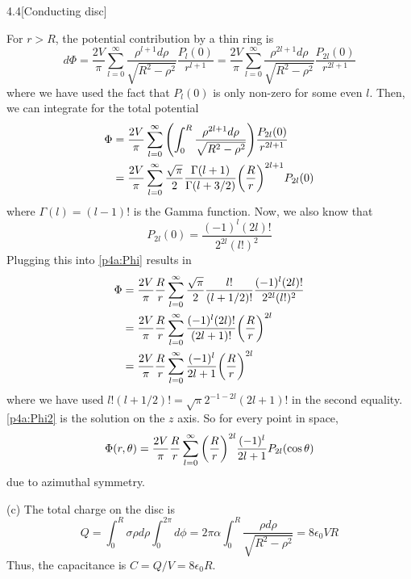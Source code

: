 \documentclass[12pt]{article}
\begin{document}
\begin{problem}{4.4}[Conducting disc]
\begin{solution}
For $r>R$, the potential contribution by a thin ring is
\begin{equation}
    d\Phi=\frac{2V}{\pi}\sum_{l=0}^\infty\frac{\rho^{l+1}d\rho}{\sqrt{R^2-\rho^2}}\frac{P_l(0)}{r^{l+1}}=\frac{2V}{\pi}\sum_{l=0}^\infty\frac{\rho^{2l+1}d\rho}{\sqrt{R^2-\rho^2}}\frac{P_{2l}(0)}{r^{2l+1}}
\end{equation}
where we have used the fact that $P_l(0)$ is only non-zero for some even $l$.
Then, we can integrate for the total potential
\begin{align}\label{p4a:Phi}
    \Phi&=\frac{2V}{\pi}\sum_{l=0}^\infty\qty(\int_0^R\frac{\rho^{2l+1}d\rho}{\sqrt{R^2-\rho^2}})\frac{P_{2l}(0)}{r^{2l+1}}
    \notag\\
        &=\frac{2V}{\pi}\sum_{l=0}^\infty\frac{\sqrt\pi}{2}\frac{\Gamma(l+1)}{\Gamma(l+3/2)}\qty(\frac{R}{r})^{2l+1}P_{2l}(0)
\end{align}
where $\Gamma(l)=(l-1)!$ is the Gamma function. Now, we also know that
\begin{equation}
    P_{2l}(0)=\frac{(-1)^l(2l)!}{2^{2l}(l!)^2} 
\end{equation}
Plugging this into \eqref{p4a:Phi} results in
\begin{align}\label{p4a:Phi2}
    \Phi&=\frac{2V}{\pi}\frac{R}{r}\sum_{l=0}^\infty\frac{\sqrt\pi}{2}\frac{l!}{(l+1/2)!}\frac{(-1)^l(2l)!}{2^{2l}(l!)^2}\notag\\
        &=\frac{2V}{\pi}\frac{R}{r}\sum_{l=0}^\infty\frac{(-1)^l(2l)!}{(2l+1)!}\qty(\frac{R}{r})^{2l}\notag\\
        &=\frac{2V}{\pi}\frac{R}{r}\sum_{l=0}^\infty\frac{(-1)^l}{2l+1}\qty(\frac{R}{r})^{2l}
\end{align}
where we have used $l!(l+1 /2)! =\sqrt{\pi}2^{-1-2l}(2l+1)!$ in the second
equality. \eqref{p4a:Phi2} is the solution on the $z$ axis. So for every point
in space,
\begin{equation}
    \Phi(r,\theta)=\frac{2V}{\pi}\frac{R}{r}\sum_{l=0}^\infty\qty(\frac{R}{r})^{2l}\frac{(-1)^l}{2l+1}P_{2l}(\cos\theta) 
\end{equation}
due to azimuthal symmetry.

(c) The total charge on the disc is
\begin{equation}
    Q=\int_0^R\sigma \rho d\rho\int_0^{2\pi}d\phi=2\pi\alpha\int_0^R\frac{\rho
    d\rho}{\sqrt{R^2-\rho^2}}=8\epsilon_0 VR 
\end{equation}
Thus, the capacitance is $C=Q /V=8\epsilon_0R$.
\end{solution}
\end{problem}
\end{document}
